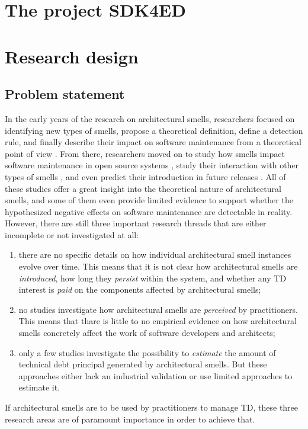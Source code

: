 
\section{The project SDK4ED}

\section{Research design}
\subsection{Problem statement}
In the early years of the research on architectural smells, researchers focused on identifying new types of smells, propose a  theoretical definition, define a detection rule, and finally describe their impact on software maintenance from a theoretical point of view \cite{Lippert2006,Garcia2009,Mo2015,Le2016,Arcelli2016}.
From there, researchers moved on to study how smells impact software maintenance in open source systems \cite{Choudhary2016,Xiao2016,Le2018}, study their interaction with other types of smells \cite{Sharma2017,Arcelli2019}, and even predict their introduction in future releases \cite{Arcelli2019b}.
All of these studies offer a great insight into the theoretical nature of architectural smells, and some of them even provide limited evidence to support whether the hypothesized negative effects on software maintenance are detectable in reality.
However, there are still three important research threads that are either incomplete or not investigated at all:
\begin{enumerate}
    \item there are no specific details on how individual architectural smell instances evolve over time. This means that it is not clear how architectural smells are \emph{introduced}, how long they \emph{persist} within the system, and whether any TD interest is \emph{paid} on the components affected by architectural smells; 
    \item no studies investigate how architectural smells are \emph{perceived} by practitioners. This means that thare is little to no empirical evidence on how architectural smells concretely affect the work of software developers and architects;
    \item only a few studies investigate the possibility to \emph{estimate} the amount of technical debt principal generated by architectural smells. But these approaches either lack an industrial validation or use limited approaches to estimate it. 
\end{enumerate}
If architectural smells are to be used by practitioners to manage TD, these three research areas are of paramount importance in order to achieve that.

